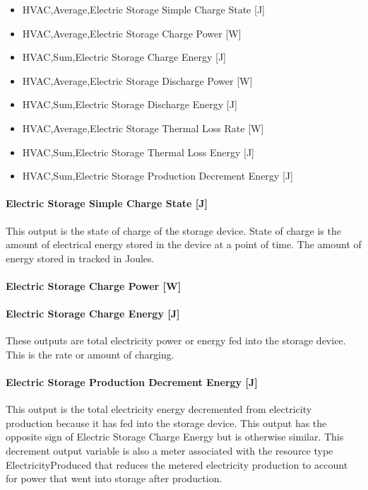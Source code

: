 \begin{itemize}
\item
  HVAC,Average,Electric Storage Simple Charge State {[}J{]}
\item
  HVAC,Average,Electric Storage Charge Power {[}W{]}
\item
  HVAC,Sum,Electric Storage Charge Energy {[}J{]}
\item
  HVAC,Average,Electric Storage Discharge Power {[}W{]}
\item
  HVAC,Sum,Electric Storage Discharge Energy {[}J{]}
\item
  HVAC,Average,Electric Storage Thermal Loss Rate {[}W{]}
\item
  HVAC,Sum,Electric Storage Thermal Loss Energy {[}J{]}
\item
  HVAC,Sum,Electric Storage Production Decrement Energy {[}J{]}
\end{itemize}

\paragraph{Electric Storage Simple Charge State {[}J{]}}\label{electric-storage-simple-charge-state-j}

This output is the state of charge of the storage device. State of charge is the amount of electrical energy stored in the device at a point of time. The amount of energy stored in tracked in Joules.

\paragraph{Electric Storage Charge Power {[}W{]}}\label{electric-storage-charge-power-w}

\paragraph{Electric Storage Charge Energy {[}J{]}}\label{electric-storage-charge-energy-j}

These outputs are total electricity power or energy fed into the storage device. This is the rate or amount of charging.

\paragraph{Electric Storage Production Decrement Energy {[}J{]}}\label{electric-storage-production-decrement-energy-j}

This output is the total electricity energy decremented from electricity production because it has fed into the storage device. This output has the opposite sign of Electric Storage Charge Energy but is otherwise similar. This decrement output variable is also a meter associated with the resource type ElectricityProduced that reduces the metered electricity production to account for power that went into storage after production.

